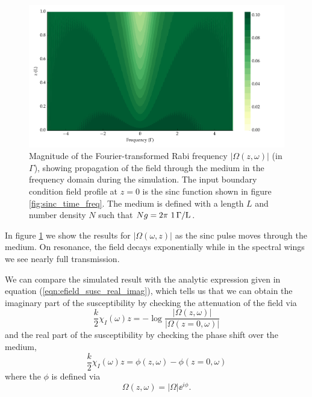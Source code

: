     \begin{figure}[]
    \includegraphics[width=\linewidth]
      {figs/02_propagation/two_mb_solve_f03_fig1.pdf}
    \caption{
    Magnitude of the Fourier-transformed Rabi frequency $\lvert \Omega(z,\omega)
    \rvert$ (in $\Gamma$), showing propagation of the field through the medium
    in the frequency domain during the simulation. The input boundary condition
    field profile at $z=0$ is the sinc function shown in figure
    \ref{fig:sinc_time_freq}. The medium is defined with a length $L$ and number
    density $N$ such that  $Ng = \unit[2\pi~1]{\Gamma /L}$.
    }
    \label{fig:sinc_freq_zt}
    \end{figure}

    In figure \ref{fig:sinc_freq_zt} we show the results for $\lvert
    \Omega(\omega, z) \rvert$ as the sinc pulse moves through the medium. On resonance, the field decays exponentially while in the spectral wings we see nearly full transmission.

    We can compare the simulated result with the analytic expression given in
    equation  (\ref{eqn:efield_susc_real_imag}), which tells us that we can
    obtain  the imaginary part of the susceptibility by checking the attenuation
    of the field via
    \begin{equation}\label{eqn:chi_im_sim}
      \frac{k}{2} \chi_I(\omega) z = -\log{\frac{\lvert \Omega(z, \omega) \rvert}{\lvert \Omega(z=0, \omega) \rvert}}
    \end{equation}
    and the real part of the susceptibility by checking the phase shift over the medium,
    \begin{equation}\label{eqn:chi_re_sim}
      \frac{k}{2} \chi_I(\omega) z = \phi(z, \omega) - \phi(z=0, \omega)
    \end{equation}
    where the $\phi$ is defined via
    \begin{equation}
      \Omega(z, \omega) = \lvert \Omega \rvert \ee^{i \phi}.
    \end{equation}

